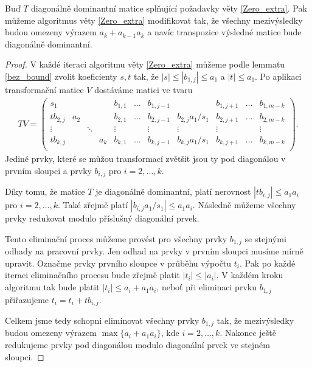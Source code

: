 \begin{lem} \label{Zero_extra_modified}
Buď $ T $ diagonálně dominantní matice splňující požadavky věty \ref{Zero_extra}.
Pak můžeme algoritmus věty \ref{Zero_extra} modifikovat tak, že všechny
mezivýsledky budou omezeny výrazem $ a_k + a_{k - 1} a_k $ 
a navíc transpozice výsledné matice bude diagonálně dominantní.
\end{lem}
\begin{proof}
V každé iteraci algoritmu věty \ref{Zero_extra} můžeme podle lemmatu
\ref{bez_bound} zvolit koeficienty $ s, t $ tak, že $ |s| \leq |b_{1,j}| \leq a_1$
a $ |t| \leq a_1 $. Po aplikaci transformační matice $ V $ dostáváme matici ve
tvaru
\begin{align*}
TV =
    \left(
    \begin{array}{cccc|ccccccc}
        s_1      &     &        &     & b_{1,1} & \hdots & b_{1,j-1} &                   & b_{1,j+1} & \hdots & b_{1,m-k} \\
        tb_{2,j} & a_2 &        &     & b_{2,1} & \hdots & b_{2,j-1} & b_{2,j} a_1 / s_1 & b_{2,j+1} & \hdots & b_{2,m-k} \\
        \vdots   &     & \ddots &     & \vdots  &        & \vdots    & \vdots            & \vdots    &        & \vdots    \\
        tb_{k,j} &     &        & a_k & b_{k,1} & \hdots & b_{k,j-1} & b_{k,j} a_1 / s_1 & b_{k,j+1} & \hdots & b_{k,m-k} \\
    \end{array}
    \right).
\end{align*}
Jediné prvky, které se můžou transformací zvětšit jsou ty pod diagonálou v 
prvním sloupci a prvky $ b_{i,j} $ pro $ i = 2,\dots,k $.

Díky tomu, že matice $ T $ je diagonálně dominantní, platí nerovnost
$ |tb_{i,j}| \leq a_1 a_i $ pro $ i = 2,\dots,k $. Také zřejmě platí
$ | b_{i,j} a_1 / s_1 | \leq a_1 a_i $. Následně můžeme všechny prvky redukovat
modulo příslušný diagonální prvek.

Tento eliminační proces můžeme provést pro všechny prvky $ b_{1, j} $ se stejnými
odhady na pracovní prvky. Jen odhad na prvky v prvním sloupci musíme mírně upravit.
Označme prvky prvního sloupce v průběhu výpočtu $ t_i $. Pak po každé iteraci
eliminačního procesu bude zřejmě platit $ |t_i| \leq |a_i| $. V každém kroku
algoritmu tak bude platit $ |t_i| \leq a_i + a_1 a_i $, neboť při eliminaci
prvku $ b_{1,j} $ přiřazujeme $ t_i = t_i + tb_{i,j} $.

Celkem jsme tedy schopni eliminovat všechny prvky $ b_{1,j} $ tak, že  
mezivýsledky budou omezeny výrazem $ \max\{ a_i + a_1 a_i \} $, kde 
$ i = 2,\dots,k $. Nakonec ještě redukujeme prvky pod diagonálou modulo 
diagonální prvek ve stejném sloupci.


\end{proof}

